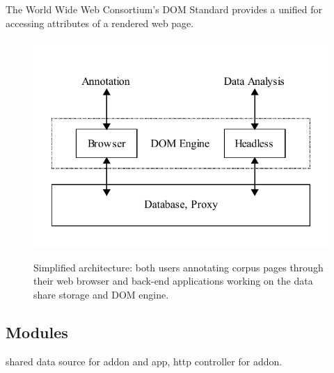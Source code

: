 The World Wide Web Consortium's DOM Standard \cite{dom} provides a unified for accessing attributes of a rendered web page.

\begin{figure}
	{\includegraphics[width=\textwidth]{arch}}
\caption{\label{f:arch}Simplified \KrdWrd architecture: both users annotating corpus pages through their web browser
and back-end applications working on the data share storage and DOM engine.}
\end{figure}


\subsection{Modules}

shared data source for addon and app, http controller for addon.
